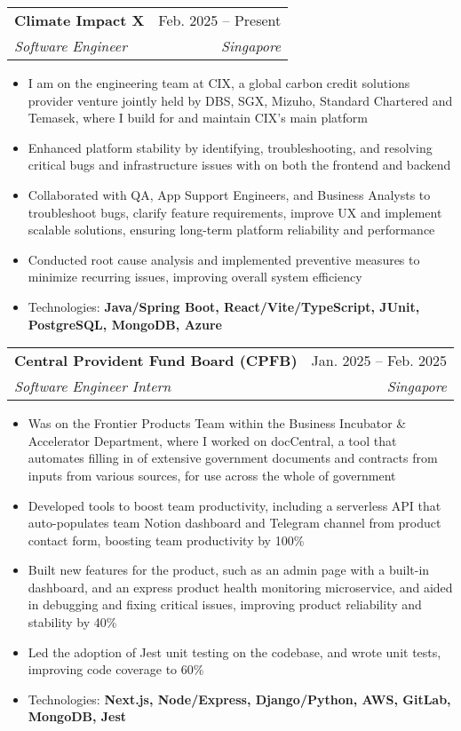 \documentclass[letterpaper,11pt]{article}
\makeatletter
\newcommand{\resumeItem}[1]{
  \item\small{
    {#1 \vspace{-2pt}}
  }
}
\newcommand{\resumeSubheading}[4]{
  \vspace{-2pt}\item
    \begin{tabular*}{0.97\textwidth}[t]{l@{\extracolsep{\fill}}r}
      \textbf{#1} & #2 \\
      \textit{\small#3} & \textit{\small #4} \\
    \end{tabular*}\vspace{-7pt}
}
\newcommand{\resumeSubSubheading}[2]{
    \item
    \begin{tabular*}{0.97\textwidth}{l@{\extracolsep{\fill}}r}
      \textit{\small#1} & \textit{\small #2} \\
    \end{tabular*}\vspace{-7pt}
}
\newcommand{\resumeSubHeadingListEnd}{\end{itemize}}
\newcommand{\resumeItemListStart}{\begin{itemize}}
\newcommand{\resumeItemListEnd}{\end{itemize}\vspace{-5pt}}
\makeatother
\begin{document}
    \resumeSubheading
    {Climate Impact X}{Feb. 2025 -- Present}
    {Software Engineer}{Singapore}
    \resumeItemListStart
      \resumeItem{I am on the engineering team at CIX, a global carbon credit solutions provider venture jointly held by DBS, SGX, Mizuho, Standard Chartered and Temasek, where I build for and maintain CIX's main platform}
      \resumeItem{Enhanced platform stability by identifying, troubleshooting, and resolving critical bugs and infrastructure issues with on both the frontend and backend}
      \resumeItem{Collaborated with QA, App Support Engineers, and Business Analysts to troubleshoot bugs, clarify feature requirements, improve UX and implement scalable solutions, ensuring long-term platform reliability and performance}
      \resumeItem{Conducted root cause analysis and implemented preventive measures to minimize recurring issues, improving overall system efficiency}
      \resumeItem{Technologies: \textbf{Java/Spring Boot, React/Vite/TypeScript, JUnit, PostgreSQL, MongoDB, Azure}}
    \resumeItemListEnd

    \resumeSubheading
    {Central Provident Fund Board (CPFB)}{Jan. 2025 -- Feb. 2025}
    {Software Engineer Intern}{Singapore}
    \resumeItemListStart
      \resumeItem{Was on the Frontier Products Team within the Business Incubator \& Accelerator Department, where I worked on docCentral, a tool that automates filling in of extensive government documents and contracts from inputs from various sources, for use across the whole of government}
      \resumeItem{Developed tools to boost team productivity, including a serverless API that auto-populates team Notion dashboard and Telegram channel from product contact form, boosting team productivity by 100\%} 
      \resumeItem{Built new features for the product, such as an admin page with a built-in dashboard, and an express product health monitoring microservice, and aided in debugging and fixing critical issues, improving product reliability and stability by 40\%}
      \resumeItem{Led the adoption of Jest unit testing on the codebase, and wrote unit tests, improving code coverage to 60\%}
      \resumeItem{Technologies: \textbf{Next.js, Node/Express, Django/Python, AWS, GitLab, MongoDB, Jest}}
    \resumeItemListEnd
\end{document}
